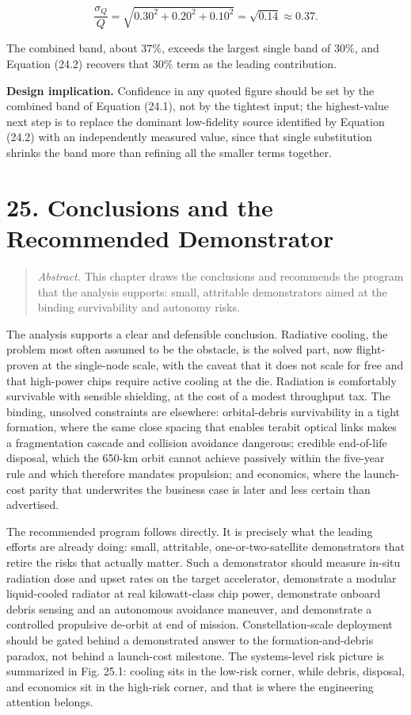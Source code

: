 \documentclass[
  11pt,
  openany,
  oneside]{book}
\begin{document}
\begin{equation}
\frac{\sigma_Q}{Q} = \sqrt{0.30^{2} + 0.20^{2} + 0.10^{2}} = \sqrt{0.14} \approx 0.37. \tag{24.3}
\end{equation}

The combined band, about \(37\%\), exceeds the largest single band of
\(30\%\), and Equation (24.2) recovers that \(30\%\) term as the leading
contribution.

\textbf{Design implication.} Confidence in any quoted figure should be
set by the combined band of Equation (24.1), not by the tightest input;
the highest-value next step is to replace the dominant low-fidelity
source identified by Equation (24.2) with an independently measured
value, since that single substitution shrinks the band more than
refining all the smaller terms together.

\chapter{25. Conclusions and the Recommended
Demonstrator}\label{conclusions-and-the-recommended-demonstrator}

\begin{quote}
\emph{Abstract.} This chapter draws the conclusions and recommends the
program that the analysis supports: small, attritable demonstrators
aimed at the binding survivability and autonomy risks.
\end{quote}

The analysis supports a clear and defensible conclusion. Radiative
cooling, the problem most often assumed to be the obstacle, is the
solved part, now flight-proven at the single-node scale, with the caveat
that it does not scale for free and that high-power chips require active
cooling at the die. Radiation is comfortably survivable with sensible
shielding, at the cost of a modest throughput tax. The binding, unsolved
constraints are elsewhere: orbital-debris survivability in a tight
formation, where the same close spacing that enables terabit optical
links makes a fragmentation cascade and collision avoidance dangerous;
credible end-of-life disposal, which the 650-km orbit cannot achieve
passively within the five-year rule and which therefore mandates
propulsion; and economics, where the launch-cost parity that underwrites
the business case is later and less certain than advertised.

The recommended program follows directly. It is precisely what the
leading efforts are already doing: small, attritable,
one-or-two-satellite demonstrators that retire the risks that actually
matter. Such a demonstrator should measure in-situ radiation dose and
upset rates on the target accelerator, demonstrate a modular
liquid-cooled radiator at real kilowatt-class chip power, demonstrate
onboard debris sensing and an autonomous avoidance maneuver, and
demonstrate a controlled propulsive de-orbit at end of mission.
Constellation-scale deployment should be gated behind a demonstrated
answer to the formation-and-debris paradox, not behind a launch-cost
milestone. The systems-level risk picture is summarized in Fig. 25.1:
cooling sits in the low-risk corner, while debris, disposal, and
economics sit in the high-risk corner, and that is where the engineering
attention belongs.
\end{document}
